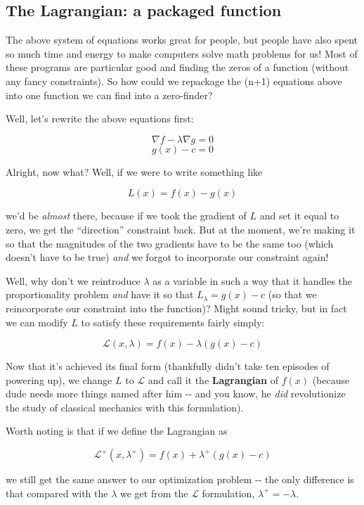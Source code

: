 \documentclass[letterpaper,12pt]{report}
\begin{document}
\label{sec:the-lagrangian-a-packaged-function}
\subsection{The Lagrangian: a packaged function} 

The above system of equations works great for people, but people have
also spent so much time and energy to make computers solve math problems
for us! Most of these programs are particular good and finding the zeros
of a function (without any fancy constraints). So how could we repackage
the (n+1) equations above into one function we can find into a
zero-finder?

Well, let's rewrite the above equations first:

\[\nabla f - \lambda \nabla g = 0\] \[g(x) - c = 0\]

Alright, now what? Well, if we were to write something like

\[ L(x) = f(x) - g(x) \]

we'd be \emph{almost} there, because if we took the gradient of \(L\)
and set it equal to zero, we get the ``direction'' constraint back. But at
the moment, we're making it so that the magnitudes of the two gradients
have to be the same too (which doesn't have to be true) \emph{and} we
forgot to incorporate our constraint again!

Well, why don't we reintroduce \(\lambda\) as a variable in such a way
that it handles the proportionality problem \emph{and} have it so that
\(L_{\lambda} = g(x) - c\) (so that we reincorporate our constraint into
the function)? Might sound tricky, but in fact we can modify \(L\) to
satisfy these requirements fairly simply:

\[ \mathcal{L}(x, \lambda) = f(x) - \lambda \left(g(x) - c\right) \]

Now that it's achieved its final form (thankfully didn't take ten
episodes of powering up), we change \(L\) to \(\mathcal{L}\) and call it
the \textbf{Lagrangian} 
of \(f(x)\) (because dude needs more things
named after him -\/- and you know, he \emph{did} revolutionize the study
of classical mechanics with this formulation).

Worth noting is that if we define the Lagrangian as

\[ \mathcal{L^+}(x, \lambda ^+) = f(x) + \lambda^+\left(g(x) - c\right) \]

we still get the same answer to our optimization problem -\/- the only
difference is that compared with the \(\lambda\) we get from the
\(\mathcal{L}\) formulation, \(\lambda ^+ = - \lambda\).
\end{document}
